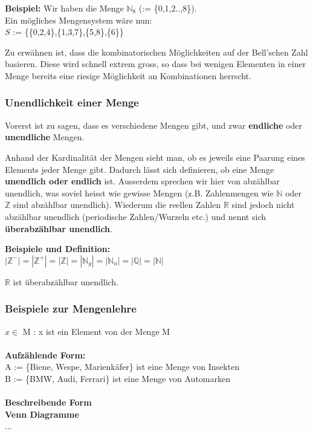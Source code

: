 \documentclass[a4paper,12pt]{article}
\begin{document}
\textbf{Beispiel:} Wir haben die Menge $\mathbb{N}_8$ (:= \{0,1,2..,8\}). \\
Ein mögliches Mengensystem wäre nun: \\
$S$ := \{\{0,2,4\},\{1,3,7\},\{5,8\},\{6\}\}

Zu erwähnen ist, dass die kombinatorischen Möglichkeiten auf der Bell'schen Zahl basieren. Diese wird schnell extrem gross, so dass bei wenigen Elementen in einer Menge bereits eine riesige Möglichkeit an Kombinationen herrscht.

\subsubsection{Unendlichkeit einer Menge}
Vorerst ist zu sagen, dass es verschiedene Mengen gibt, und zwar \textbf{endliche} oder \textbf{unendliche} Mengen.

Anhand der Kardinalität der Mengen sieht man, ob es jeweils eine Paarung eines Elements jeder Menge gibt. Dadurch lässt sich definieren, ob eine Menge \textbf{unendlich oder endlich} ist. Ausserdem sprechen wir hier von abzählbar unendlich, was soviel heisst wie gewisse Mengen (z.B. Zahlenmengen wie $\mathbb{N}$ oder $\mathbb{Z}$ sind abzählbar unendlich). Wiederum die reellen Zahlen $\mathbb{R}$ sind jedoch nicht abzählbar unendlich (periodische Zahlen/Wurzeln etc.) und nennt sich \textbf{überabzählbar unendlich}.

\textbf{Beispiele und Definition:} \\
$|\mathbb{Z}^{-}| = |\mathbb{Z}^{+}| = |\mathbb{Z}| = |\mathbb{N}_g| = |\mathbb{N}_u| = |\mathbb{Q}| = |\mathbb{N}|$

$\mathbb{R}$ ist überabzählbar unendlich.










\subsubsection*{Beispiele zur Mengenlehre}
$x \in $ M : x ist ein Element von der Menge M \\
\\
\textbf{Aufzählende Form:} \\
A := \{Biene, Wespe, Marienkäfer\} ist eine Menge von Insekten \\
B := \{BMW, Audi, Ferrari\} ist eine Menge von Automarken \\
\\
\textbf{Beschreibende Form} \\
\textbf{Venn Diagramme} \\
...
\end{document}
